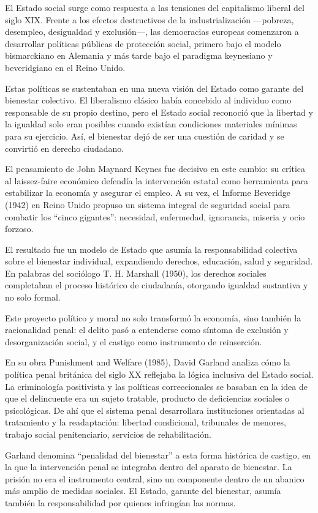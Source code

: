 \documentclass[
  spanish,
  letterpaper,
  DIV=11,
  numbers=noendperiod]{scrreprt}
\begin{document}
El Estado social surge como respuesta a las tensiones del capitalismo
liberal del siglo XIX. Frente a los efectos destructivos de la
industrialización ---pobreza, desempleo, desigualdad y exclusión---, las
democracias europeas comenzaron a desarrollar políticas públicas de
protección social, primero bajo el modelo bismarckiano en Alemania y más
tarde bajo el paradigma keynesiano y beveridgiano en el Reino Unido.

Estas políticas se sustentaban en una nueva visión del Estado como
garante del bienestar colectivo. El liberalismo clásico había concebido
al individuo como responsable de su propio destino, pero el Estado
social reconoció que la libertad y la igualdad solo eran posibles cuando
existían condiciones materiales mínimas para su ejercicio. Así, el
bienestar dejó de ser una cuestión de caridad y se convirtió en derecho
ciudadano.

El pensamiento de John Maynard Keynes fue decisivo en este cambio: su
crítica al laissez-faire económico defendía la intervención estatal como
herramienta para estabilizar la economía y asegurar el empleo. A su vez,
el Informe Beveridge (1942) en Reino Unido propuso un sistema integral
de seguridad social para combatir los ``cinco gigantes'': necesidad,
enfermedad, ignorancia, miseria y ocio forzoso.

El resultado fue un modelo de Estado que asumía la responsabilidad
colectiva sobre el bienestar individual, expandiendo derechos,
educación, salud y seguridad. En palabras del sociólogo T. H. Marshall
(1950), los derechos sociales completaban el proceso histórico de
ciudadanía, otorgando igualdad sustantiva y no solo formal.

Este proyecto político y moral no solo transformó la economía, sino
también la racionalidad penal: el delito pasó a entenderse como síntoma
de exclusión y desorganización social, y el castigo como instrumento de
reinserción.

En su obra Punishment and Welfare (1985), David Garland analiza cómo la
política penal británica del siglo XX reflejaba la lógica inclusiva del
Estado social. La criminología positivista y las políticas
correccionales se basaban en la idea de que el delincuente era un sujeto
tratable, producto de deficiencias sociales o psicológicas. De ahí que
el sistema penal desarrollara instituciones orientadas al tratamiento y
la readaptación: libertad condicional, tribunales de menores, trabajo
social penitenciario, servicios de rehabilitación.

Garland denomina ``penalidad del bienestar'' a esta forma histórica de
castigo, en la que la intervención penal se integraba dentro del aparato
de bienestar. La prisión no era el instrumento central, sino un
componente dentro de un abanico más amplio de medidas sociales. El
Estado, garante del bienestar, asumía también la responsabilidad por
quienes infringían las normas.
\end{document}
